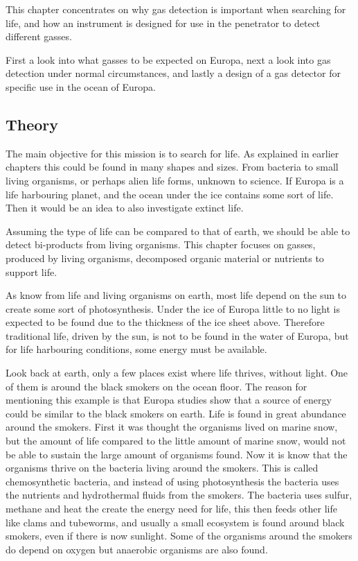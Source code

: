 
This chapter concentrates on why gas detection is important when searching for life, and how an instrument is designed for use in the penetrator to detect different gasses.

First a look into what gasses to be expected on Europa, next a look into gas detection under normal circumstances, and lastly a design of a gas detector for specific use in the ocean of Europa.

\subsection{Theory}

The main objective for this mission is to search for life. As explained in earlier chapters this could be found in many shapes and sizes. From bacteria to small living organisms, or perhaps alien life forms, unknown to science. If Europa is a life harbouring planet, and the ocean under the ice contains some sort of life. Then it would be an idea to also investigate extinct life.

Assuming the type of life can be compared to that of earth, we should be able to detect bi-products from living organisms. This chapter focuses on gasses, produced by living organisms, decomposed organic material or nutrients to support life.

As know from life and living organisms on earth, most life depend on the sun to create some sort of photosynthesis. Under the ice of Europa little to no light is expected to be found due to the thickness of the ice sheet above. Therefore traditional life, driven by the sun, is not to be found in the water of Europa, but for life harbouring conditions, some energy must be available.

Look back at earth, only a few places exist where life thrives, without light. One of them is around the black smokers on the ocean floor. The reason for mentioning this example is that Europa studies\cite{schmidtocean} show that a source of energy could be similar to the black smokers on earth. Life is found in great abundance around the smokers. First it was thought the organisms lived on marine snow, but the amount of life compared to the little amount of marine snow, would not be able to sustain the large amount of organisms found. Now it is know that the organisms thrive on the bacteria living around the smokers. This is called chemosynthetic bacteria, and instead of using photosynthesis the bacteria uses the nutrients and hydrothermal fluids from the smokers. The bacteria uses sulfur, methane and heat the create the energy need for life, this then feeds other life like clams and tubeworms, and usually a small ecosystem is found around black smokers, even if there is now sunlight. Some of the organisms around the smokers do depend on oxygen but anaerobic organisms are also found\cite{PMEL}.

